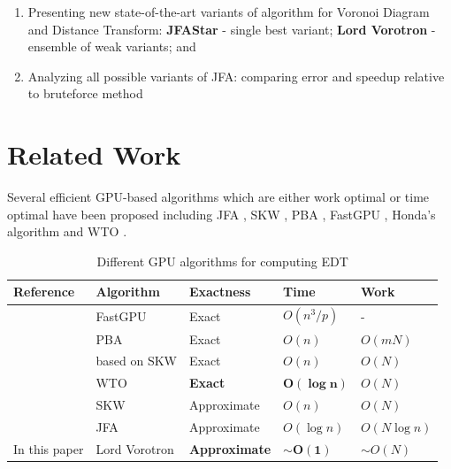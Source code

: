 \documentclass[format=acmsmall,screen,review,authordraft,nonacm]{acmart}
\newcommand{\ourjfasingle}{JFAStar}
\newcommand{\ourjfa}{Lord Vorotron} %
\begin{document}
\begin{enumerate}
	\item Presenting new state-of-the-art variants of algorithm for Voronoi
		Diagram and Distance Transform: \newline
		\textbf{\ourjfasingle} - single best variant;
		\textbf{\ourjfa} - ensemble of weak variants; and
	\item Analyzing all possible variants of JFA: comparing error and speedup
		relative to bruteforce method
\end{enumerate}

\section{Related Work} %

Several efficient GPU-based algorithms which are either
work optimal or time optimal have been proposed including
JFA \cite{rong2006jump}, SKW \cite{schneider2009gpu},
PBA \cite{cao2010parallel}, FastGPU \cite{de2017fast}, Honda's algorithm \cite{honda2017simple} and
WTO \cite{manduhu2019work}.

\begin{table}[H] \centering
\begin{tabular}{@{}lllll@{}}
\toprule
Reference                & Algorithm    & Exactness   & Time         & Work         \\ \midrule
\citep{de2017fast}       & FastGPU      & Exact       & $O(n^3/p)$   & -            \\
\citep{cao2010parallel}  & PBA          & Exact       & $O(n)$       & $O(mN)$      \\
\citep{honda2017simple}  & based on SKW & Exact       & $O(n)$       & $O(N)$       \\
\citep{manduhu2019work}  & WTO          & \cellcolor{blue!25}\textbf{Exact}& \cellcolor{blue!25}$\bm{O(\log n)}$  & $O(N)$       \\
\citep{schneider2009gpu} & SKW          & Approximate & $O(n)$       & $O(N)$       \\
\citep{rong2006jump}     & JFA          & Approximate & $O(\log n)$  & $O(N\log n)$ \\ \bottomrule
In this paper            & \ourjfa      & \cellcolor{blue!25}\textbf{Approximate} & \cellcolor{blue!25}$\sim$$\bm{O(1)}$ & $\sim$$O(N)$ \\ \bottomrule
\end{tabular}
\vspace{1em}
\caption{Different GPU algorithms for computing EDT}
\end{table}
\end{document}
